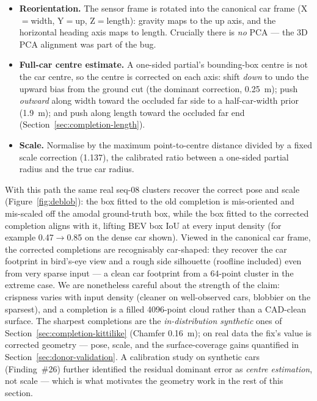 \begin{itemize}
  \item \textbf{Reorientation.} The sensor frame is rotated into the canonical
    car frame (X${}={}$width, Y${}={}$up, Z${}={}$length): gravity maps to the
    up axis, and the horizontal heading axis maps to length. Crucially there is
    \emph{no} PCA --- the 3D PCA alignment was part of the bug.
  \item \textbf{Full-car centre estimate.} A one-sided partial's bounding-box
    centre is not the car centre, so the centre is corrected on each axis: shift
    \emph{down} to undo the upward bias from the ground cut (the dominant
    correction, \SI{0.25}{\meter}); push \emph{outward} along width toward the
    occluded far side to a half-car-width prior (\SI{1.9}{\meter}); and push
    along length toward the occluded far end (Section~\ref{sec:completion-length}).
  \item \textbf{Scale.} Normalise by the maximum point-to-centre distance divided
    by a fixed scale correction (\num{1.137}), the calibrated ratio between a
    one-sided partial radius and the true car radius.
\end{itemize}

With this path the same real seq-08 clusters recover the correct pose and scale
(Figure~\ref{fig:deblob}): the box fitted to the old completion is mis-oriented
and mis-scaled off the amodal ground-truth box, while the box fitted to the
corrected completion aligns with it, lifting BEV box IoU at every input density
(for example \num{0.47}$\to$\num{0.85} on the dense car shown). Viewed in the
canonical car frame, the corrected completions are recognisably car-shaped: they
recover the car footprint in bird's-eye view and a rough side silhouette
(roofline included) even from very sparse input --- a clean car footprint from a
\num{64}-point cluster in the extreme case. We are nonetheless careful about the
strength of the claim: crispness varies with input density (cleaner on
well-observed cars, blobbier on the sparsest), and a completion is a filled
\num{4096}-point cloud rather than a CAD-clean surface. The sharpest completions
are the \emph{in-distribution synthetic} ones of
Section~\ref{sec:completion-kittilike} (Chamfer \SI{0.16}{\meter}); on real data
the fix's value is corrected geometry --- pose, scale, and the surface-coverage
gains quantified in Section~\ref{sec:donor-validation}. A calibration study on
synthetic cars (Finding~\#26) further identified the residual dominant error as
\emph{centre estimation}, not scale --- which is what motivates the geometry work
in the rest of this section.

